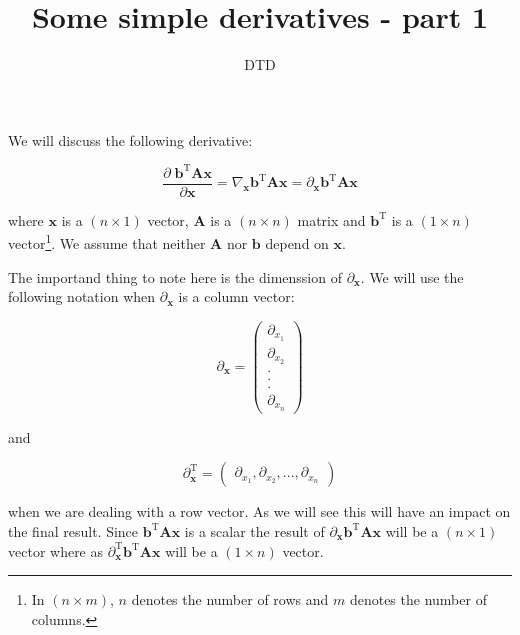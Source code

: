 \documentclass{article}
\title{Some simple derivatives - part 1}
\author{DTD}
\begin{document}
\maketitle

We will discuss the following derivative:

\begin{equation}
\frac{\partial \; \textbf{b}^\text{T} \textbf{A} \textbf{x}}{\partial \textbf{x}} = \nabla_{\textbf{x}} \textbf{b}^\text{T} \textbf{A} \textbf{x} = \partial_\textbf{x} \textbf{b}^\text{T} \textbf{A} \textbf{x}
\end{equation}

\noindent where $\textbf{x}$ is a $(n \times 1)$ vector, $\textbf{A}$ is a $(n \times n)$ matrix and $\textbf{b}^\text{T}$ is a $(1 \times n)$ vector\footnote{In $(n \times m)$, $n$ denotes the number of rows and $m$ denotes the number of columns.}. We assume that neither $\textbf{A}$ nor $\textbf{b}$ depend on $\textbf{x}$. 

The importand thing to note here is the dimenssion of $\partial_\textbf{x}$. We will use the following notation when $\partial_\textbf{x}$ is a column vector:

\begin{equation}
\partial_\textbf{x} = \begin{pmatrix} \partial_{x_1} \\ \partial_{x_2} \\ .\\ .\\ .\\  \partial_{x_n} \end{pmatrix}
\end{equation}

\noindent and

\begin{equation}
\partial^\text{T}_\textbf{x} = \begin{pmatrix} \partial_{x_1} , \partial_{x_2} , . . .,  \partial_{x_n} \end{pmatrix}
\end{equation}

\noindent when we are dealing with a row vector. As we will see this will have an impact on the final result. Since $\textbf{b}^\text{T} \textbf{A} \textbf{x}$ is a scalar the result of $\partial_\textbf{x} \textbf{b}^\text{T} \textbf{A} \textbf{x}$ will be a $(n \times 1)$ vector where as $\partial^\text{T}_\textbf{x} \textbf{b}^\text{T} \textbf{A} \textbf{x}$ will be a $(1 \times n)$ vector.
\end{document}
